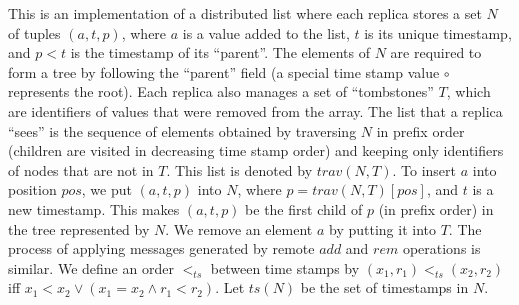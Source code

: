 This is an implementation of a distributed list where each replica stores a set $N$ of tuples $(a,t,p)$, where $a$ is a value added to the list, $t$ is its unique timestamp, and $p < t$ is the timestamp of its ``parent''. The elements of $N$ are required to form a tree by following the ``parent'' field (a special time stamp value $\circ$ represents the root).
Each replica also manages a set of ``tombstones'' $T$, which are identifiers of values that were removed from the array. The list that a replica ``sees'' is the sequence of elements obtained by traversing $N$ in prefix order (children are visited in decreasing time stamp order) and keeping only identifiers of nodes that are not in $T$. This list is denoted by $\mathit{trav}(N,T)$. 
To insert $a$ into position $\mathit{pos}$, we put $(a,t,p)$ into $N$, where $p = \mathit{trav}(N,T)[\mathit{pos}]$, and $t$ is a new timestamp. This makes $(a,t,p)$ be the first child of $p$ (in prefix order) in the tree represented by $N$. We remove an element $a$ by putting it into $T$. The process of applying messages generated by remote $\mathit{add}$ and $\mathit{rem}$ operations is similar. We define an order $<_{\mathit{ts}}$ between time stamps by $(x_1,r_1) <_{\mathit{ts}} (x_2,r_2)$ iff $x_1 < x_2 \vee (x_1 = x_2 \wedge r_1 < r_2)$. Let $\mathit{ts}(N)$ be the set of timestamps in $N$.









